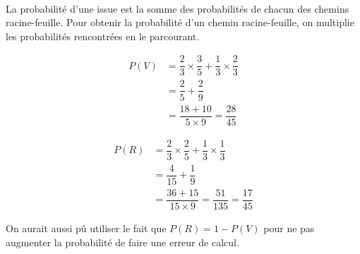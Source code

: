\begin{sol}
	\, \\
	\begin{center}
	\end{center}
	La probabilité d'une issue est la somme des probabilités de chacun des chemins racine-feuille.
	Pour obtenir la probabilité d'un chemin racine-feuille, on multiplie les probabilités rencontrées en le parcourant.
	
		\begin{align*}
			P(V) &= \dfrac23 \times \dfrac35 + \dfrac13 \times \dfrac23 \\
				&= \dfrac25 + \dfrac29 \\
				&= \dfrac{18 + 10}{5 \times 9} = \dfrac{28}{45}
		\end{align*}
	
		\begin{align*}
			P(R) &= \dfrac23 \times \dfrac25 + \dfrac13 \times \dfrac13 \\
				&= \dfrac4{15} + \dfrac19 \\
				&= \dfrac{36 + 15}{15 \times 9} = \dfrac{51}{135} = \dfrac{17}{45}
		\end{align*}
		
		On aurait aussi pû utiliser le fait que $P(R) = 1 - P(V)$ pour ne pas augmenter la probabilité de faire une erreur de calcul.
\end{sol}
\fi


